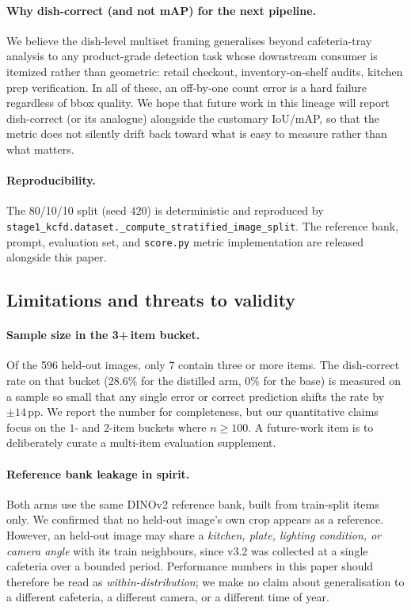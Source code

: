 \paragraph{Why dish-correct (and not mAP) for the next pipeline.} We
believe the dish-level multiset framing generalises beyond cafeteria-tray
analysis to any product-grade detection task whose downstream consumer is
itemized rather than geometric: retail checkout, inventory-on-shelf
audits, kitchen prep verification. In all of these, an off-by-one count
error is a hard failure regardless of bbox quality. We hope that future
work in this lineage will report dish-correct (or its analogue) alongside
the customary IoU/mAP, so that the metric does not silently drift back
toward what is easy to measure rather than what matters.

\paragraph{Reproducibility.} The 80/10/10 split (seed $420$) is
deterministic and reproduced by
\texttt{stage1\_kcfd.dataset.\_compute\_stratified\_image\_split}.
The reference bank, prompt, evaluation set, and \texttt{score.py} metric
implementation are released alongside this paper.

\subsection{Limitations and threats to validity}
\label{sec:lim}

\paragraph{Sample size in the 3+\,item bucket.} Of the 596 held-out
images, only $7$ contain three or more items. The dish-correct rate on
that bucket ($28.6\%$ for the distilled arm, $0\%$ for the base) is
measured on a sample so small that any single error or correct prediction
shifts the rate by $\pm 14\,$pp. We report the number for completeness,
but our quantitative claims focus on the $1$- and $2$-item buckets where
$n \geq 100$. A future-work item is to deliberately curate a multi-item
evaluation supplement.

\paragraph{Reference bank leakage in spirit.} Both arms use the same
DINOv2 reference bank, built from train-split items only. We confirmed
that no held-out image's own crop appears as a reference. However, an
held-out image may share a \emph{kitchen, plate, lighting condition,
or camera angle} with its train neighbours, since v3.2 was collected at a
single cafeteria over a bounded period. Performance numbers in this
paper should therefore be read as \emph{within-distribution}; we make no
claim about generalisation to a different cafeteria, a different camera,
or a different time of year.

